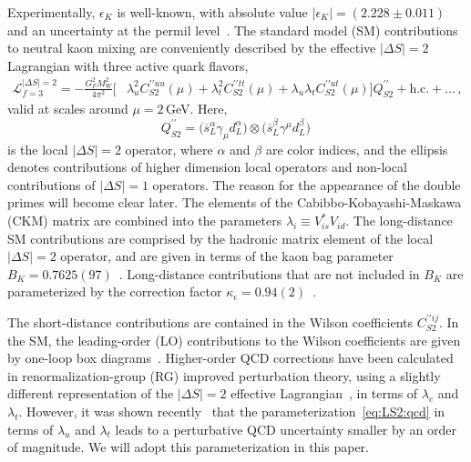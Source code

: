 \documentclass[letter,11pt,DIV=12,abstract=true,numbers=noenddot,titlepage=false,twocolumn=false,draft=false]{scrartcl}
\begin{document}
Experimentally, $\epsilon_K$ is well-known, with absolute value
$|\epsilon_K| = (2.228 \pm 0.011)$ and an uncertainty at the permil
level~\cite{ParticleDataGroup:2020ssz}. The standard model (SM)
contributions to neutral kaon mixing are conveniently described by the
effective $|\Delta S| = 2$ Lagrangian with three active quark flavors,
\begin{equation}\label{eq:LS2:qcd}
\begin{split}
	\mathcal{L}^{|\Delta S|=2}_{f=3} = - \frac{G_F^2 M_W^2}{4 \pi^2}
    \big[ & \lambda_u^2 C_{S2}^{\prime \prime uu}(\mu) + \lambda_t^2 C_{S2}^{\prime \prime tt}
    (\mu) + \lambda_u \lambda_t C_{S2}^{\prime \prime ut}(\mu) \big]  Q_{S2}^{\prime \prime}
      + \textrm{h.c.} + \dots \,,
\end{split}
\end{equation}
valid at scales around $\mu = 2\,$GeV. Here,
\begin{equation}\label{eq:def:QS2}
Q_{S2}^{\prime \prime} =
\big(\overline{s}_L^\alpha \gamma_{\mu} d_L^\alpha\big) \otimes
\big(\overline{s}_L^\beta \gamma^{\mu}d_L^\beta\big)\,
\end{equation}
is the local $|\Delta S| = 2$ operator, where $\alpha$ and $\beta$ are
color indices, and the ellipsis denotes contributions of higher
dimension local operators and non-local contributions of $|\Delta S| =
1$ operators. The reason for the appearance of the double primes will
become clear later. The elements of the Cabibbo-Kobayashi-Maskawa
(CKM) matrix are combined into the parameters $\lambda_i \equiv
V_{is}^* V_{id}$. The long-distance SM contributions are comprised by
the hadronic matrix element of the local $|\Delta S| = 2$ operator,
and are given in terms of the kaon bag parameter $B_K =
0.7625(97)$~\cite{Aoki:2019cca}. Long-distance contributions that are
not included in $B_K$ are parameterized by the correction factor
$\kappa_\epsilon = 0.94(2)$~\cite{Buras:2010pza}.

The short-distance contributions are contained in the Wilson
coefficients $C_{S2}^{\prime \prime ij}$. In the SM, the leading-order
(LO) contributions to the Wilson coefficients are given by one-loop
box diagrams~\cite{Inami:1980fz}. Higher-order QCD corrections have
been calculated in renormalization-group (RG) improved perturbation
theory, using a slightly different representation of the $|\Delta S| =
2$ effective Lagrangian~\cite{Buchalla:1995vs}, in terms of
$\lambda_c$ and $\lambda_t$. However, it was shown
recently~\cite{Brod:2019rzc} that the
parameterization~\eqref{eq:LS2:qcd} in terms of $\lambda_u$ and
$\lambda_t$ leads to a perturbative QCD uncertainty smaller by an
order of magnitude. We will adopt this parameterization in this paper.
\end{document}
